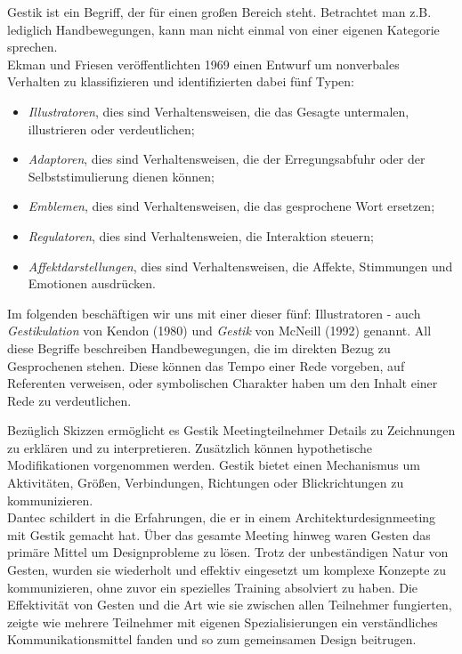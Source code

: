 \medskip Gestik ist ein Begriff, der für einen großen Bereich steht. Betrachtet man z.B. lediglich Handbewegungen, kann man nicht einmal von einer eigenen Kategorie sprechen. \citep{Goldin:2003} \\ Ekman und Friesen veröffentlichten 1969 einen Entwurf um nonverbales Verhalten zu klassifizieren und identifizierten dabei fünf Typen:
\begin{itemize}
	\item \emph{Illustratoren}, dies sind Verhaltensweisen, die das Gesagte untermalen, illustrieren oder verdeutlichen;
	\item \emph{Adaptoren}, dies sind Verhaltensweisen, die der Erregungsabfuhr oder der Selbststimulierung dienen können;
	\item \emph{Emblemen}, dies sind Verhaltensweisen, die das gesprochene Wort ersetzen;
	\item \emph{Regulatoren}, dies sind Verhaltensweien, die Interaktion steuern;
	\item \emph{Affektdarstellungen}, dies sind Verhaltensweisen, die Affekte, Stimmungen und Emotionen ausdrücken.
\end{itemize} \begin{flushright} \citep{Schaefer:2003} \end{flushright}

Im folgenden beschäftigen wir uns mit einer dieser fünf: Illustratoren - auch \emph{Gestikulation} von Kendon (1980) und \emph{Gestik} von McNeill (1992) genannt. All diese Begriffe beschreiben Handbewegungen, die im direkten Bezug zu Gesprochenen stehen. Diese können das Tempo einer Rede vorgeben, auf Referenten verweisen, oder symbolischen Charakter haben um den Inhalt einer Rede zu verdeutlichen. \citep{Goldin:2003}

\medskip Bezüglich Skizzen ermöglicht es Gestik Meetingteilnehmer Details zu Zeichnungen zu erklären und zu interpretieren. Zusätzlich können hypothetische Modifikationen vorgenommen werden. Gestik bietet einen Mechanismus um Aktivitäten, Größen, Verbindungen, Richtungen oder Blickrichtungen zu kommunizieren. 
\\ Dantec schildert in \citep{Dantec:2009} die Erfahrungen, die er in einem Architekturdesignmeeting mit Gestik gemacht hat.  Über das gesamte Meeting hinweg waren Gesten das primäre Mittel um Designprobleme zu lösen. Trotz der unbeständigen Natur von Gesten, wurden sie wiederholt und effektiv eingesetzt um komplexe Konzepte zu kommunizieren, ohne zuvor ein spezielles Training absolviert zu haben. Die Effektivität von Gesten und die Art wie sie zwischen allen Teilnehmer fungierten, zeigte wie mehrere Teilnehmer mit eigenen Spezialisierungen ein verständliches Kommunikationsmittel fanden und so zum gemeinsamen Design beitrugen.

